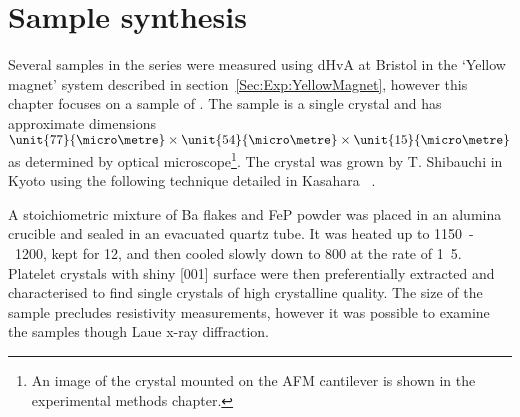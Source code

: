 \section{Sample synthesis}

Several samples in the \BaFeAsP{} series were measured using \ac{dHvA} at Bristol in the `Yellow magnet' system described in section~\ref{Sec:Exp:YellowMagnet}, however this chapter focuses on a sample of \BaFeP. The sample is a single crystal and has approximate dimensions $\unit{77}{\micro\metre}\times\unit{54}{\micro\metre}\times \unit{15}{\micro\metre}$ as determined by optical microscope\footnote{An image of the crystal mounted on the \ac{AFM} cantilever is shown in the experimental methods chapter.}. The crystal was grown by T. Shibauchi in Kyoto using the following technique detailed in Kasahara \etal~\cite{Kasahara2010}. 

A stoichiometric mixture of Ba flakes and FeP powder was placed in an alumina crucible and sealed in an evacuated quartz tube. It was heated up to \unit{1150-1200}{\celsius}, kept for \unit{12}{\hour}, and then cooled slowly down to \unit{800}{\celsius} at the rate of \unit{1.5}{\celsius\per\hour}. Platelet crystals with shiny [001] surface were then preferentially extracted and characterised to find single crystals of high crystalline quality. The size of the sample precludes resistivity measurements, however it was possible to examine the samples though Laue x-ray diffraction.

